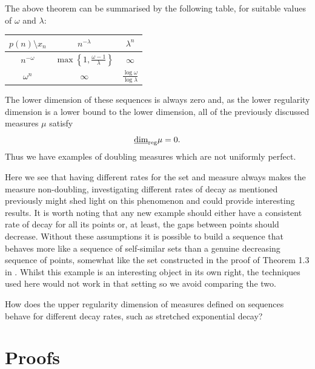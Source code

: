 The above theorem can be summarised by the following table, for suitable values of $\omega$ and $\lambda$:


\begin{table}[h]
	\centering
	\label{ch-upper-reg:sequencetable}
	\begin{tabular}{c|cc}
		$p(n) \setminus x_n$ & $n^{-\lambda}$             & $\lambda^n$                        \\ \hline
		$n^{-\omega}$       & $\max \left\{1,\frac{\omega - 1}{\lambda}\right\}$ & $\infty$\\
		$\omega^n$          & $\infty$                         & $\frac{\log \omega}{\log \lambda}$
	\end{tabular}
\end{table}

The lower dimension of these sequences is always zero and, as the lower regularity dimension is a lower bound to the lower dimension, all of the previously discussed measures $\mu$ satisfy 
\[
\underline{\dim}_{\textup{reg}} \mu = 0.
\]
Thus we have examples of doubling measures which are not uniformly perfect. 

Here we see that having different rates for the set and measure always makes the measure non-doubling, investigating different rates of decay as mentioned previously might shed light on this phenomenon and could provide interesting results. It is worth noting that any new example should either have a consistent rate of decay for all its points or, at least, the gaps between points should decrease. Without these assumptions it is possible to build a sequence that behaves more like a sequence of self-similar sets than a genuine decreasing sequence of points, somewhat like the set constructed in the proof of Theorem 1.3 in \cite{microsets}. Whilst this example is an interesting object in its own right, the techniques used here would not work in that setting so we avoid comparing the two.

\begin{question}
How does the upper regularity dimension of measures defined on sequences behave for different decay rates, such as stretched exponential decay?
\end{question}



\section{Proofs} \label{ch-upper-reg:proof}

